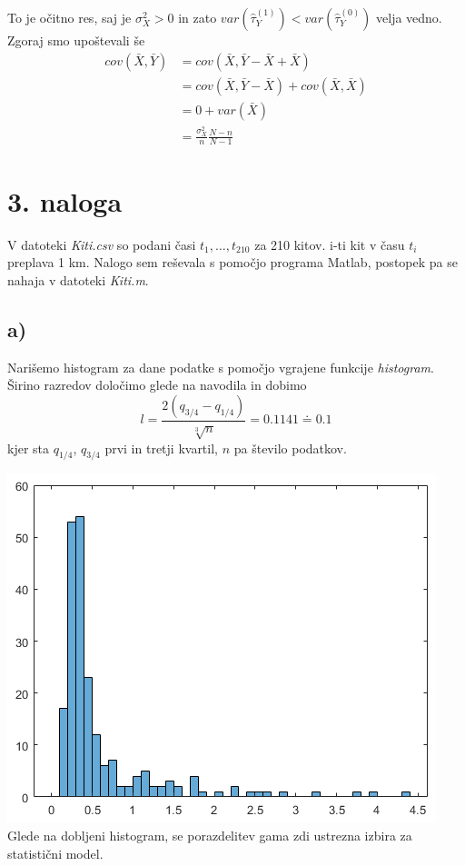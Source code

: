 \documentclass[A4paper, 11pt]{article}
\begin{document}
To je očitno res, saj je $\sigma_X^2 > 0$ in zato $var(\hat{\tau}_Y ^ {(1)}) < var(\hat{\tau}_Y ^ {(0)}) $ velja vedno.
Zgoraj smo upoštevali še
\[
\begin{split}
cov(\bar{X}, \bar{Y}) & = cov(\bar{X}, \bar{Y} - \bar{X} + \bar{X}) \\
                                   & = cov(\bar{X}, \bar{Y} - \bar{X}) + cov(\bar{X}, \bar{X}) \\
                                   & = 0 + var(\bar{X}) \\
                                   & = \frac{\sigma_X^2}{n} \frac{N - n}{N - 1}
\end{split}
\]



\section*{3. naloga}

V datoteki \textit{Kiti.csv} so podani časi $t_1, \ldots, t_{210}$ za 210 kitov. i-ti kit v času $t_i$ preplava 1 km. Nalogo sem reševala s pomočjo programa Matlab, postopek pa se nahaja v datoteki \textit{Kiti.m}.

\subsection*{a)}
Narišemo histogram za dane podatke s pomočjo vgrajene funkcije \textit{histogram}. Širino razredov določimo glede na navodila in dobimo 
\[ l = \frac{2(q_{3/4} - q_{1/4})}{\sqrt[3]{n}} = 0.1141 \doteq 0.1 \]
kjer sta $q_{1/4}$, $q_{3/4}$ prvi in tretji kvartil, $n$ pa število podatkov.

\includegraphics[scale=0.8]{Kiti_1}
\\
Glede na dobljeni histogram, se porazdelitev gama zdi ustrezna izbira za statistični model.
\end{document}
